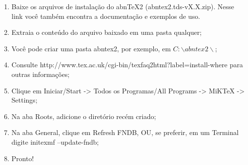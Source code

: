 \begin{enumerate}
\item Baixe os arquivos de instalação do abnTeX2 (abntex2.tds-vX.X.zip). Nesse link você também encontra a documentação e exemplos de uso.
\item Extraia o conteúdo do arquivo baixado em uma pasta qualquer;
\item Você pode criar uma pasta abntex2, por exemplo, em $C:\backslash abntex2\backslash$;
\item Consulte http://www.tex.ac.uk/cgi-bin/texfaq2html?label=install-where para outras informações;
\item Clique em Iniciar/Start -> Todos os Programas/All Programs -> MiKTeX -> Settings;
\item Na aba Roots, adicione o diretório recém criado;
\item Na aba General, clique em Refresh FNDB, OU, se preferir, em um Terminal digite initexmf --update-fndb;
\item Pronto!
\end{enumerate}
